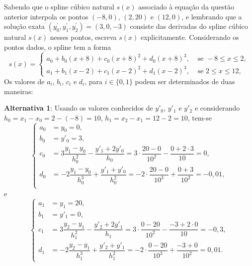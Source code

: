 \documentclass[12pt,a4paper]{article}
\begin{document}
\begin{ExerciseList}
\Exercise[title={2,0}] Sabendo que o spline cúbico natural $s(x)$ associado à equação da questão anterior interpola os pontos $(-8, 0)$, $(2, 20)$ e $(12, 0)$, e lembrando que a solução exata $(y_0^\prime, y_1^\prime, y_2^\prime) = (3, 0, -3)$ consiste das derivadas do spline cúbico natural $s(x)$ nesses pontos, escreva $s(x)$ explicitamente.
\Answer Considerando os pontos dados, o spline tem a forma
\[
  s(x) =
  \begin{cases}
    a_0 + b_0(x + 8) + c_0(x + 8)^2 +d_0(x + 8)^3, & \text{ se } -8 \leq x \leq 2,\\
    a_1 + b_1(x - 2) + c_1(x - 2)^2 +d_1(x - 2)^3, & \text{ se } 2 \leq x \leq 12,
  \end{cases}
\]
Os valores de $a_i$, $b_i$, $c_i$ e $d_i$, para $i \in \{0, 1\}$ podem ser determinados de duas maneiras:

\textbf{Alternativa 1}: Usando os valores conhecidos de $y'_0$, $y'_1$ e $y'_2$ e considerando $h_0 = x_1 - x_0 = 2 - (-8) = 10$, $h_1 = x_2 - x_1 = 12 - 2 = 10$, tem-se
\[
\begin{cases}
  a_0 & = y_0 = 0,\\
  b_0 & = y'_0 = 3,\\
  c_0 & = 3\dfrac{y_1-y_0}{h_0^2}-\dfrac{y'_1+2y'_0}{h_0}
        = 3\cdot \dfrac{20-0}{10^2}-\dfrac{0 + 2\cdot 3}{10}
        = 0,\\
  d_0 & = -2\dfrac{y_1-y_0}{h_0^3}+\dfrac{y'_1+y'_0}{h_0^2}
        = -2\cdot \dfrac{20-0}{10^3}+\dfrac{0+3}{10^2}
        = -0,01,\\
\end{cases}
\]
e
\[
\begin{cases}
  a_1 & = y_1 = 20,\\
  b_1 & = y'_1 = 0,\\
  c_1 & = 3\dfrac{y_2-y_1}{h_1^2}-\dfrac{y'_2+2y'_1}{h_1}
        = 3\cdot \dfrac{0-20}{10^2}-\dfrac{-3 + 2\cdot 0}{10}
        = -0,3,\\
  d_1 & = -2\dfrac{y_2-y_1}{h_1^3}+\dfrac{y'_2+y'_1}{h_1^2}
        = -2\cdot \dfrac{0-20}{10^3}+\dfrac{-3+0}{10^2}
        = 0,01.
\end{cases}
\]


\end{ExerciseList}
\end{document}
